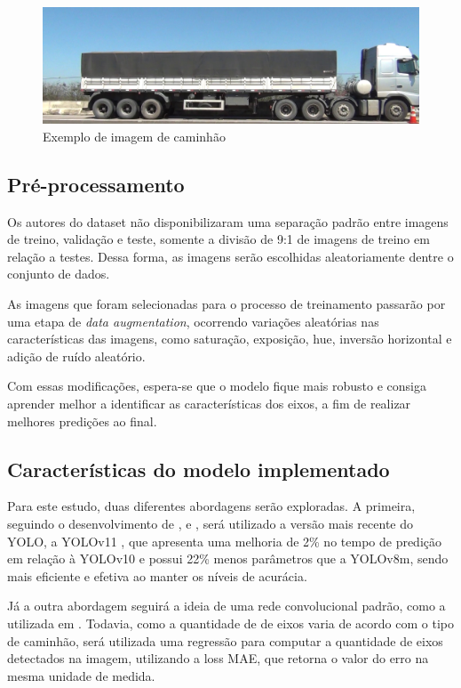 \documentclass[12pt]{article}
\begin{document}
        \begin{figure}[ht]
            \centering
            \includegraphics[width=.75\textwidth]{Images/20160927102749_color-[ROI-1]-1.jpg}
            \caption{Exemplo de imagem de caminhão}
            \label{fig:caminhaoExemplo}
        \end{figure}

    \subsection{Pré-processamento}

        Os autores do dataset não disponibilizaram uma separação padrão entre imagens de treino, validação e teste, somente a divisão de 9:1 de imagens de treino em relação a testes. Dessa forma, as imagens serão escolhidas aleatoriamente dentre o conjunto de dados.

        As imagens que foram selecionadas para o processo de treinamento passarão por uma etapa de \textit{data augmentation}, ocorrendo variações aleatórias nas características das imagens, como saturação, exposição, hue, inversão horizontal e adição de ruído aleatório.

        Com essas modificações, espera-se que o modelo fique mais robusto e consiga aprender melhor a identificar as características dos eixos, a fim de realizar melhores predições ao final.

    \subsection{Características do modelo implementado}
        Para este estudo, duas diferentes abordagens serão exploradas. A primeira, seguindo o desenvolvimento de \cite{Souza2024}, \cite{marcomini2023truckaxledetectionconvolutional} e \cite{Miles2022}, será utilizado a versão mais recente do YOLO, a YOLOv11 \cite{khanam2024yolov11overviewkeyarchitectural}, que apresenta uma melhoria de 2\% no tempo de predição em relação à YOLOv10 e possui 22\% menos parâmetros que a YOLOv8m, sendo mais eficiente e efetiva ao manter os níveis de acurácia. 
        
        Já a outra abordagem seguirá a ideia de uma rede convolucional padrão, como a utilizada em \cite{Almutairi2022}. Todavia, como a quantidade de de eixos varia de acordo com o tipo de caminhão, será utilizada uma regressão para computar a quantidade de eixos detectados na imagem, utilizando a loss MAE, que retorna o valor do erro na mesma unidade de medida.
\end{document}
